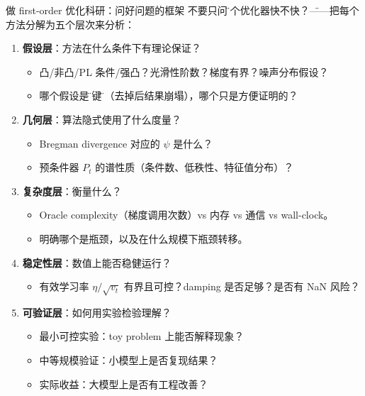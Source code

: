 \documentclass[aspectratio=169,10pt]{ctexbeamer}
\begin{document}
\begin{frame}{做 first-order 优化科研：问好问题的框架}
不要只问\"这个优化器快不快？\"——把每个方法分解为五个层次来分析：

\vspace{.2cm}
\begin{enumerate}
  \item \textbf{假设层}：方法在什么条件下有理论保证？
  \begin{itemize}
    \item 凸/非凸/PL 条件/强凸？光滑性阶数？梯度有界？噪声分布假设？
    \item 哪个假设是\"关键\"的（去掉后结果崩塌），哪个只是方便证明的？
  \end{itemize}
  \item \textbf{几何层}：算法隐式使用了什么度量？
  \begin{itemize}
    \item Bregman divergence 对应的 $\psi$ 是什么？
    \item 预条件器 $P_t$ 的谱性质（条件数、低秩性、特征值分布）？
  \end{itemize}
  \item \textbf{复杂度层}：衡量什么？
  \begin{itemize}
    \item Oracle complexity（梯度调用次数）vs 内存 vs 通信 vs wall-clock。
    \item 明确哪个是瓶颈，以及在什么规模下瓶颈转移。
  \end{itemize}
  \item \textbf{稳定性层}：数值上能否稳健运行？
  \begin{itemize}
    \item 有效学习率 $\eta/\sqrt{v_t}$ 有界且可控？damping 是否足够？是否有 NaN 风险？
  \end{itemize}
  \item \textbf{可验证层}：如何用实验检验理解？
  \begin{itemize}
    \item 最小可控实验：toy problem 上能否解释现象？
    \item 中等规模验证：小模型上是否复现结果？
    \item 实际收益：大模型上是否有工程改善？
  \end{itemize}
\end{enumerate}
\end{frame}
\end{document}
